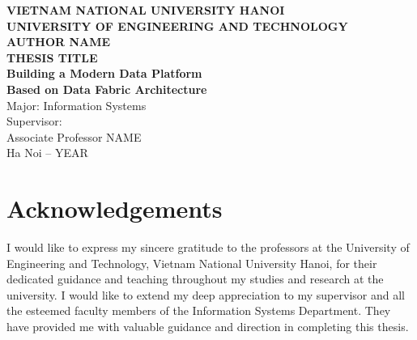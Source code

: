 \documentclass[12pt,a4paper,oneside]{book}
\theoremstyle{plain}
\begin{document}
\frontmatter
\dominitoc

\begin{titlepage}
\begin{center}

\vspace*{1.5cm}
{\Large\textbf{VIETNAM NATIONAL UNIVERSITY HANOI}}\\[0.3cm]
{\Large\textbf{UNIVERSITY OF ENGINEERING AND TECHNOLOGY}}\\[2cm]

{\LARGE\bfseries AUTHOR NAME}\\[2cm]

{\LARGE\bfseries\color{chaptercolor}
THESIS TITLE\\
Building a Modern Data Platform\\
Based on Data Fabric Architecture}\\[2cm]

{\large Major: Information Systems}\\[1.5cm]

{\large Supervisor:}\\
{\large Associate Professor NAME}\\[2cm]

{\large Ha Noi -- YEAR}

\vfill

\end{center}
\end{titlepage}

\clearpage\thispagestyle{empty}\null\clearpage

\chapter*{Acknowledgements}

I would like to express my sincere gratitude to the professors at the University of Engineering and Technology, Vietnam National University Hanoi, for their dedicated guidance and teaching throughout my studies and research at the university. I would like to extend my deep appreciation to my supervisor and all the esteemed faculty members of the Information Systems Department. They have provided me with valuable guidance and direction in completing this thesis.
\end{document}
